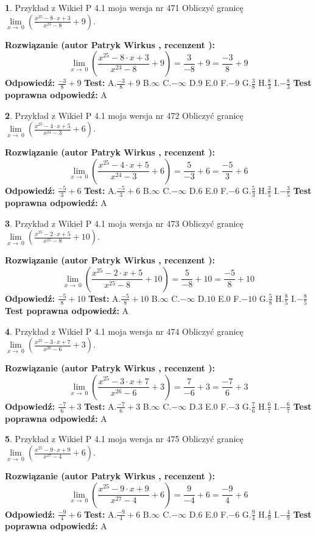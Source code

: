 \documentclass[12pt, a4paper]{article}
\theoremstyle{definition} %
\newtheorem{zad}{}
\newcommand{\zadStart}[1]{\begin{zad}#1\newline}
\newcommand{\zadStop}{\end{zad}}
\newcommand{\rozwStart}[2]{\noindent \textbf{Rozwiązanie (autor #1 , recenzent #2): }\newline}
\newcommand{\rozwStop}{\newline}
\newcommand{\odpStart}{\noindent \textbf{Odpowiedź:}\newline}
\newcommand{\odpStop}{\newline}
\newcommand{\testStart}{\noindent \textbf{Test:}\newline}
\newcommand{\testStop}{\newline}
\newcommand{\kluczStart}{\noindent \textbf{Test poprawna odpowiedź:}\newline}
\newcommand{\kluczStop}{\newline}
\begin{document}
\zadStart{Przykład z Wikieł P 4.1 moja wersja nr 471}
Obliczyć granicę $\lim\limits_{x\to\ 0}(\frac{x^{25}-8 \cdot x +3}{x^{23}-8}+9)$.
\zadStop
\rozwStart{Patryk Wirkus}{}
$$\lim\limits_{x\to\ 0}(\frac{x^{25}-8 \cdot x +3}{x^{23}-8}+9)=\frac{3}{-8}+9=\frac{-3}{8}+9$$
\rozwStop
\odpStart
$\frac{-3}{8}+9$
\odpStop
\testStart
A.$\frac{-3}{8}+9$
B.$\infty$
C.$-\infty$
D.$9$
E.$0$
F.$-9$
G.$\frac{3}{8}$
H.$\frac{8}{3}$
I.$-\frac{8}{3}$
\testStop
\kluczStart
A
\kluczStop



\zadStart{Przykład z Wikieł P 4.1 moja wersja nr 472}
Obliczyć granicę $\lim\limits_{x\to\ 0}(\frac{x^{25}-4 \cdot x +5}{x^{24}-3}+6)$.
\zadStop
\rozwStart{Patryk Wirkus}{}
$$\lim\limits_{x\to\ 0}(\frac{x^{25}-4 \cdot x +5}{x^{24}-3}+6)=\frac{5}{-3}+6=\frac{-5}{3}+6$$
\rozwStop
\odpStart
$\frac{-5}{3}+6$
\odpStop
\testStart
A.$\frac{-5}{3}+6$
B.$\infty$
C.$-\infty$
D.$6$
E.$0$
F.$-6$
G.$\frac{5}{3}$
H.$\frac{3}{5}$
I.$-\frac{3}{5}$
\testStop
\kluczStart
A
\kluczStop



\zadStart{Przykład z Wikieł P 4.1 moja wersja nr 473}
Obliczyć granicę $\lim\limits_{x\to\ 0}(\frac{x^{25}-2 \cdot x +5}{x^{25}-8}+10)$.
\zadStop
\rozwStart{Patryk Wirkus}{}
$$\lim\limits_{x\to\ 0}(\frac{x^{25}-2 \cdot x +5}{x^{25}-8}+10)=\frac{5}{-8}+10=\frac{-5}{8}+10$$
\rozwStop
\odpStart
$\frac{-5}{8}+10$
\odpStop
\testStart
A.$\frac{-5}{8}+10$
B.$\infty$
C.$-\infty$
D.$10$
E.$0$
F.$-10$
G.$\frac{5}{8}$
H.$\frac{8}{5}$
I.$-\frac{8}{5}$
\testStop
\kluczStart
A
\kluczStop



\zadStart{Przykład z Wikieł P 4.1 moja wersja nr 474}
Obliczyć granicę $\lim\limits_{x\to\ 0}(\frac{x^{25}-3 \cdot x +7}{x^{26}-6}+3)$.
\zadStop
\rozwStart{Patryk Wirkus}{}
$$\lim\limits_{x\to\ 0}(\frac{x^{25}-3 \cdot x +7}{x^{26}-6}+3)=\frac{7}{-6}+3=\frac{-7}{6}+3$$
\rozwStop
\odpStart
$\frac{-7}{6}+3$
\odpStop
\testStart
A.$\frac{-7}{6}+3$
B.$\infty$
C.$-\infty$
D.$3$
E.$0$
F.$-3$
G.$\frac{7}{6}$
H.$\frac{6}{7}$
I.$-\frac{6}{7}$
\testStop
\kluczStart
A
\kluczStop



\zadStart{Przykład z Wikieł P 4.1 moja wersja nr 475}
Obliczyć granicę $\lim\limits_{x\to\ 0}(\frac{x^{25}-9 \cdot x +9}{x^{27}-4}+6)$.
\zadStop
\rozwStart{Patryk Wirkus}{}
$$\lim\limits_{x\to\ 0}(\frac{x^{25}-9 \cdot x +9}{x^{27}-4}+6)=\frac{9}{-4}+6=\frac{-9}{4}+6$$
\rozwStop
\odpStart
$\frac{-9}{4}+6$
\odpStop
\testStart
A.$\frac{-9}{4}+6$
B.$\infty$
C.$-\infty$
D.$6$
E.$0$
F.$-6$
G.$\frac{9}{4}$
H.$\frac{4}{9}$
I.$-\frac{4}{9}$
\testStop
\kluczStart
A
\kluczStop
\end{document}
